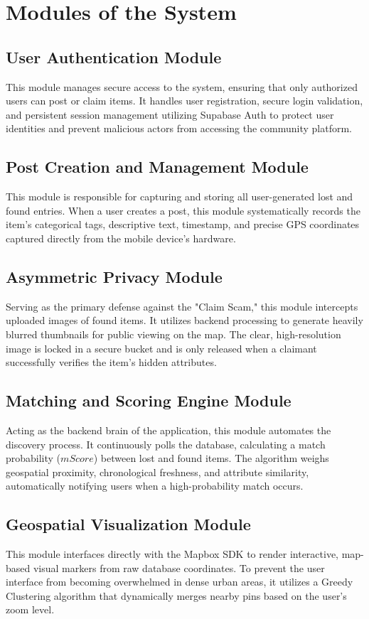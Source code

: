 \documentclass[12pt,a4paper]{report}
\begin{document}
\section{Modules of the System}

\subsection{User Authentication Module}
This module manages secure access to the system, ensuring that only authorized users can post or claim items. It handles user registration, secure login validation, and persistent session management utilizing Supabase Auth to protect user identities and prevent malicious actors from accessing the community platform.

\subsection{Post Creation and Management Module}
This module is responsible for capturing and storing all user-generated lost and found entries. When a user creates a post, this module systematically records the item's categorical tags, descriptive text, timestamp, and precise GPS coordinates captured directly from the mobile device's hardware.

\subsection{Asymmetric Privacy Module}
Serving as the primary defense against the "Claim Scam," this module intercepts uploaded images of found items. It utilizes backend processing to generate heavily blurred thumbnails for public viewing on the map. The clear, high-resolution image is locked in a secure bucket and is only released when a claimant successfully verifies the item's hidden attributes.

\subsection{Matching and Scoring Engine Module}
Acting as the backend brain of the application, this module automates the discovery process. It continuously polls the database, calculating a match probability ($mScore$) between lost and found items. The algorithm weighs geospatial proximity, chronological freshness, and attribute similarity, automatically notifying users when a high-probability match occurs.

\subsection{Geospatial Visualization Module}
This module interfaces directly with the Mapbox SDK to render interactive, map-based visual markers from raw database coordinates. To prevent the user interface from becoming overwhelmed in dense urban areas, it utilizes a Greedy Clustering algorithm that dynamically merges nearby pins based on the user's zoom level.
\end{document}
